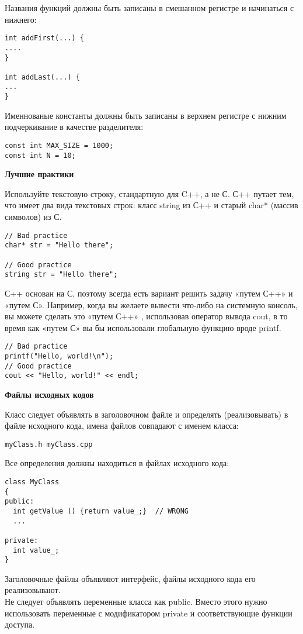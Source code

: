 \documentclass[12pt]{article}
\begin{document}
Названия функций должны быть записаны в смешанном регистре и начинаться с нижнего:
\begin{lstlisting}
int addFirst(...) {
....
}

int addLast(...) {
...
}
\end{lstlisting}

Именнованые константы должны быть записаны в верхнем регистре с нижним подчеркивание в качестве разделителя:
\begin{lstlisting}
const int MAX_SIZE = 1000;
const int N = 10;
\end{lstlisting}

\textbf{Лучшие практики}

Используйте текстовую строку, стандартную для C++, а не С. С++ путает тем, что имеет два вида текстовых строк: класс string из С++ и старый char* (массив символов) из С.
\begin{lstlisting}
// Bad practice
char* str = "Hello there";

// Good practice
string str = "Hello there";
\end{lstlisting}

С++ основан на С, поэтому всегда есть вариант решить задачу «путем С++» и «путем С». Например, когда вы желаете вывести что-либо на системную консоль, вы можете сделать это «путем С++» , использовав оператор вывода cout, в то время как «путем С» вы бы использовали глобальную функцию вроде printf.
\begin{lstlisting}
// Bad practice
printf("Hello, world!\n");
// Good practice
cout << "Hello, world!" << endl;
\end{lstlisting}
\textbf{Файлы исходных кодов}

 Класс следует объявлять в заголовочном файле и определять (реализовывать) в файле исходного кода, имена файлов совпадают с именем класса:
\begin{lstlisting}
myClass.h myClass.cpp
\end{lstlisting}

Все определения должны находиться в файлах исходного кода:
\begin{lstlisting}
class MyClass
{
public:
  int getValue () {return value_;}  // WRONG
  ...

private:
  int value_;
}
\end{lstlisting}
Заголовочные файлы объявляют интерфейс, файлы исходного кода его реализовывают.
\\Не следует объявлять переменные класса как public. Вместо этого нужно использовать переменные с модификатором private и соответствующие
функции доступа.
\end{document}
